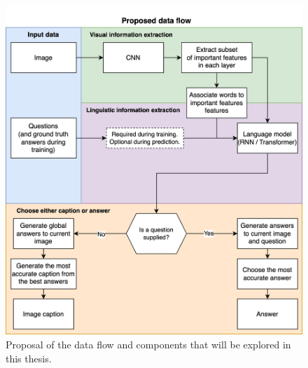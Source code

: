 \begin{figure}[htb]
    \centering
    \includegraphics[width=12cm]{images/architecture_proposal.png}
    \caption{Proposal of the data flow and components that will be explored in this thesis.}
    \label{fig:architecture_proposal}
\end{figure}